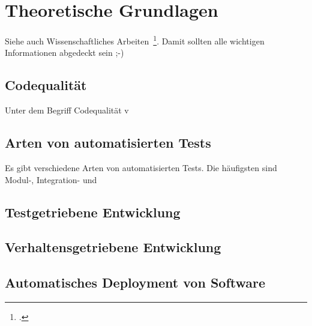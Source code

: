 \newpage
\section{Theoretische Grundlagen}
Siehe auch Wissenschaftliches Arbeiten~\footcite[Vgl. ][Seite 1]{Balzert.2008}. Damit sollten alle wichtigen Informationen abgedeckt sein ;-)

\subsection{Codequalität}
Unter dem Begriff Codequalität v

\subsection{Arten von automatisierten Tests}
Es gibt verschiedene Arten von automatisierten Tests. Die häufigsten sind Modul-, Integration- und  

\subsection{Testgetriebene Entwicklung}

\subsection{Verhaltensgetriebene Entwicklung}


\subsection{Automatisches Deployment von Software}
